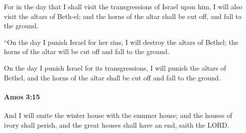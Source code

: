 			\begin{versebox}
					\item[BHS] 
					\item[LXX] 
					\item[ASV] For in the day that I shall visit the transgressions of Israel upon him, I will also visit the altars of Beth-el; and the horns of the altar shall be cut off, and fall to the ground.
					\item[NIV] “On the day I punish Israel for her sins, I will destroy the altars of Bethel; the horns of the altar will be cut off and fall to the ground.
					\item[NRSV] On the day I punish Israel for its transgressions, I will punish the altars of Bethel, and the horns of the altar shall be cut off and fall to the ground.
			\end{versebox}

		\paragraph{Amos 3:15} %
			\label{AMOS-3-15}

			And I will smite the winter house with the summer house; and the houses of ivory shall perish, and the great houses shall have an end, saith the LORD.

